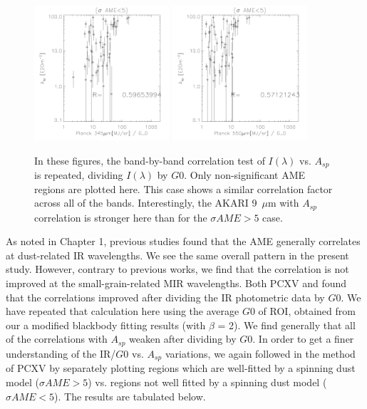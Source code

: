 \begin{figure}[!htb]
  \includegraphics[width=50mm]{IRIntG0MWAmp/planck857G0_Asp_nosp.pdf}
  \includegraphics[width=50mm]{IRIntG0MWAmp/planck545G0_Asp_nosp.pdf}
\caption{In these figures, the band-by-band correlation test of $I({\lambda})$ vs. $A_{sp}$ is repeated, dividing $I({\lambda})$ by $G0$. Only non-significant AME regions are plotted here. This case shows a similar correlation factor across all of the bands. Interestingly,  the AKARI 9~$\mu$m with $A_{sp}$ correlation is stronger here than for the $\sigma AME > 5$ case.
}
\label{fig:IRIntG0MWAmpnosp}
\end{figure}
     As noted in Chapter 1, previous studies found that the AME generally correlates at dust-related IR wavelengths. We see the same overall pattern in the present study. However, contrary to previous works, we find that the correlation is not improved at the small-grain-related MIR wavelengths.
     Both PCXV and \cite{ysard10b} found that the correlations improved after dividing the IR photometric data by $G0$. We have repeated that calculation here using the average $G0$ of ROI, obtained from our a modified blackbody fitting results (with $\beta$ = 2). We find generally that all of the correlations with $A_{sp}$ weaken after dividing by $G0$. 
     In order to get a finer understanding of the IR/$G0$ vs. $A_{sp}$ variations, we again followed in the method of PCXV by separately plotting regions which are well-fitted by a spinning dust model ($\sigma AME>5$) vs. regions not well fitted by a spinning dust model ($\sigma AME<5$). The results are tabulated below.

